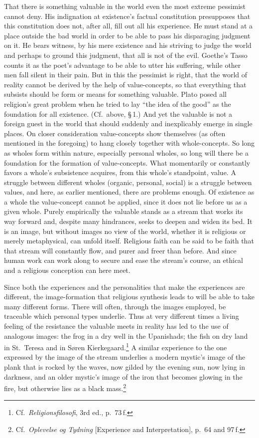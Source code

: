 \documentclass[12pt]{book}
\newcommand{\opage}[1]{\marginnote{\footnotesize\textit{[#1]}}}
\begin{document}
That there is something valuable in the world even the most extreme pessimist cannot deny. His indignation
at existence's factual constitution presupposes that this constitution does not, after all, fill out all
his experience. He must stand at a place outside the bad world \opage{102}in order to be able to pass his disparaging
judgment on it. He bears witness, by his mere existence and his striving to judge the world and perhaps to
ground this judgment, that all is not of the evil. Goethe's Tasso counts it as the poet's advantage to be
able to utter his suffering, while other men fall silent in their pain. But in this the pessimist is right,
that the world of reality cannot be derived by the help of value-concepts, so that everything that subsists
should be form or means for something valuable. Plato posed all religion's great problem when he tried to
lay ``the idea of the good'' as the foundation for all existence. (Cf.\ above, \S\,1.) And yet the valuable
is not a foreign guest in the world that should suddenly and inexplicably emerge in single places. On
closer consideration value-concepts show themselves (as often mentioned in the foregoing) to hang closely
together with whole-concepts. So long as wholes form within nature, especially personal wholes, so long
will there be a foundation for the formation of value-concepts. What momentarily or constantly favors a
whole's subsistence acquires, from this whole's standpoint, value. A struggle between different wholes
(organic, personal, social) is a struggle between values, and here, as earlier mentioned, there are problems
enough. Of existence as a whole the value-concept cannot be applied, since it does not lie before us as a
given whole. Purely empirically the valuable stands as a stream that works its way forward and, despite
many hindrances, seeks to deepen and widen its bed. It is an image, but without images no view of the
world, whether it is religious or merely metaphysical, can unfold itself. Religious faith can be said to be
faith that that stream will constantly flow, and purer and freer \opage{103}than before. And since human work can work
along to secure and ease the stream's course, an ethical and a religious conception can here meet.

Since both the experiences and the personalities that make the experiences are different, the
image-formation that religious synthesis leads to will be able to take many different forms. There will
often, through the images employed, be traceable which personal types underlie. Thus at very different times
a living feeling of the resistance the valuable meets in reality has led to the use of analogous images: the
frog in a dry well in the Upanishads; the fish on dry land in St.\ Teresa and in Søren
Kierkegaard.\footnote{Cf.\ \textit{Religionsfilosofi}, 3rd ed., p.\ 73\,f.} A similar experience to the one
expressed by the image of the stream underlies a modern mystic's image of the plank that is rocked by the
waves, now gilded by the evening sun, now lying in darkness, and an older mystic's image of the iron that
becomes glowing in the fire, but otherwise lies as a black mass.\footnote{Cf.\ \textit{Oplevelse og Tydning}
[Experience and Interpretation], p.\ 64 and 97\,f.}
\end{document}
